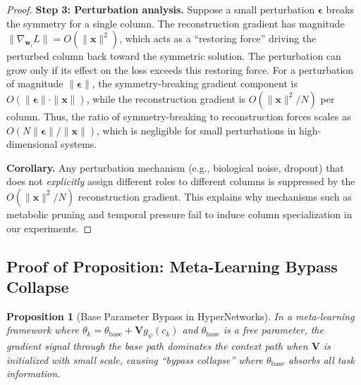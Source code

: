 \documentclass{article}
\newtheorem{proposition}[theorem]{Proposition}
\begin{document}
\begin{proof}
\textbf{Step 3: Perturbation analysis.}
Suppose a small perturbation $\boldsymbol{\epsilon}$ breaks the symmetry for a single column. The reconstruction gradient has magnitude $\|\nabla_{\mathbf{w}_i} L\| = O(\|\mathbf{x}\|^2)$, which acts as a ``restoring force'' driving the perturbed column back toward the symmetric solution. The perturbation can grow only if its effect on the loss exceeds this restoring force. For a perturbation of magnitude $\|\boldsymbol{\epsilon}\|$, the symmetry-breaking gradient component is $O(\|\boldsymbol{\epsilon}\| \cdot \|\mathbf{x}\|)$, while the reconstruction gradient is $O(\|\mathbf{x}\|^2 / N)$ per column. Thus, the ratio of symmetry-breaking to reconstruction forces scales as $O(N \|\boldsymbol{\epsilon}\| / \|\mathbf{x}\|)$, which is negligible for small perturbations in high-dimensional systems.

\textbf{Corollary.}
Any perturbation mechanism (e.g., biological noise, dropout) that does not \emph{explicitly} assign different roles to different columns is suppressed by the $O(\|\mathbf{x}\|^2/N)$ reconstruction gradient. This explains why mechanisms such as metabolic pruning and temporal pressure fail to induce column specialization in our experiments.
\end{proof}


\subsection{Proof of Proposition: Meta-Learning Bypass Collapse}
\label{app:proof_bypass}

\begin{proposition}[Base Parameter Bypass in HyperNetworks]
\label{prop:bypass}
In a meta-learning framework where $\theta_k = \theta_\mathrm{base} + \mathbf{V} g_\psi(c_k)$ and $\theta_\mathrm{base}$ is a free parameter, the gradient signal through the base path dominates the context path when $\mathbf{V}$ is initialized with small scale, causing ``bypass collapse'' where $\theta_\mathrm{base}$ absorbs all task information.
\end{proposition}
\end{document}
